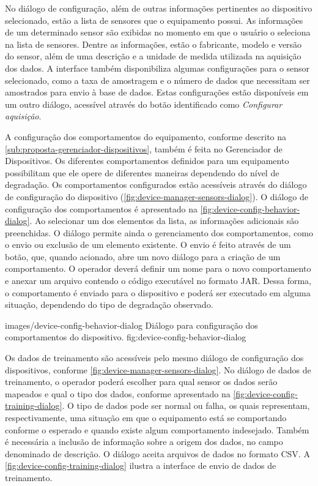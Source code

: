 No diálogo de configuração, além de outras informações pertinentes ao dispositivo selecionado, estão
a lista de sensores que o equipamento possui. As informações de um determinado sensor são exibidas
no momento em que o usuário o seleciona na lista de sensores. Dentre as informações, estão o
fabricante, modelo e versão do sensor, além de uma descrição e a unidade de medida utilizada na
aquisição dos dados. A interface também disponibiliza algumas configurações para o sensor
selecionado, como a taxa de amostragem e o número de dados que necessitam ser amostrados para envio
à base de dados. Estas configurações estão disponíveis em um outro diálogo, acessível através do
botão identificado como \emph{Configurar aquisição}.

A configuração dos comportamentos do equipamento, conforme descrito na
\cref{sub:proposta-gerenciador-dispositivos}, também é feita no Gerenciador de Dispositivos. Os
diferentes comportamentos definidos para um equipamento possibilitam que ele opere de diferentes
maneiras dependendo do nível de degradação. Os comportamentos configurados estão acessíveis através
do diálogo de configuração do dispositivo (\cref{fig:device-manager-sensors-dialog}). O diálogo de
configuração dos comportamentos é apresentado na \cref{fig:device-config-behavior-dialog}. Ao
selecionar um dos elementos da lista, as informações adicionais são preenchidas. O diálogo permite
ainda o gerenciamento dos comportamentos, como o envio ou exclusão de um elemento existente. O envio
é feito através de um botão, que, quando acionado, abre um novo diálogo para a criação de um
comportamento. O operador deverá definir um nome para o novo comportamento e anexar um arquivo
contendo o código executável no formato \gls{JAR}. Dessa forma, o comportamento é enviado para o
dispositivo e poderá ser executado em alguma situação, dependendo do tipo de degradação observado.

  {images/device-config-behavior-dialog}
  {Diálogo para configuração dos comportamentos do dispositivo.}
  {fig:device-config-behavior-dialog}

Os dados de treinamento são acessíveis pelo mesmo diálogo de configuração dos dispositivos, conforme
\cref{fig:device-manager-sensors-dialog}. No diálogo de dados de treinamento, o operador poderá
escolher para qual sensor os dados serão mapeados e qual o tipo dos dados, conforme apresentado na
\cref{fig:device-config-training-dialog}. O tipo de dados pode ser normal ou falha, os quais
representam, respectivamente, uma situação em que o equipamento está se comportando conforme o
esperado e quando existe algum comportamento indesejado. Também é necessária a inclusão de
informação sobre a origem dos dados, no campo denominado de descrição. O diálogo aceita arquivos de
dados no formato \gls{CSV}. A \cref{fig:device-config-training-dialog} ilustra a interface de envio
de dados de treinamento.

